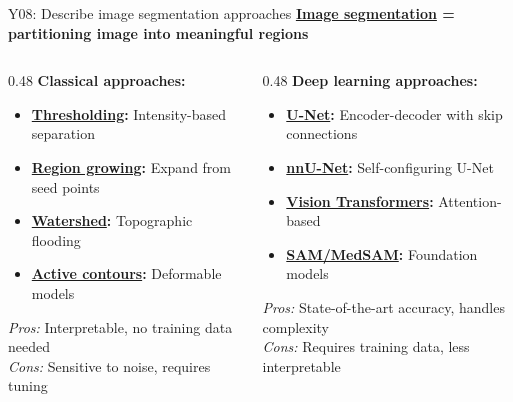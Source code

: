 \documentclass[aspectratio=169, 10pt]{beamer}
\begin{document}
\begin{frame}{Y08: Describe image segmentation approaches}
    \textbf{\href{https://en.wikipedia.org/wiki/Image_segmentation}{Image segmentation} = partitioning image into meaningful regions}
    
    \vspace{0.2cm}
    \begin{columns}[T]
        \begin{column}{0.48\textwidth}
            \textbf{Classical approaches:}
            \begin{itemize}
                \item \textbf{\href{https://en.wikipedia.org/wiki/Thresholding_(image_processing)}{Thresholding}:} Intensity-based separation
                \item \textbf{\href{https://en.wikipedia.org/wiki/Region_growing}{Region growing}:} Expand from seed points
                \item \textbf{\href{https://en.wikipedia.org/wiki/Watershed_(image_processing)}{Watershed}:} Topographic flooding
                \item \textbf{\href{https://en.wikipedia.org/wiki/Active_contour_model}{Active contours}:} Deformable models
            \end{itemize}
            
            \vspace{0.2cm}
            \textit{Pros:} Interpretable, no training data needed\\
            \textit{Cons:} Sensitive to noise, requires tuning
        \end{column}
        \begin{column}{0.48\textwidth}
            \textbf{Deep learning approaches:}
            \begin{itemize}
                \item \textbf{\href{https://arxiv.org/abs/1505.04597}{U-Net}:} Encoder-decoder with skip connections
                \item \textbf{\href{https://arxiv.org/abs/1802.02611}{nnU-Net}:} Self-configuring U-Net
                \item \textbf{\href{https://arxiv.org/abs/2010.11929}{Vision Transformers}:} Attention-based
                \item \textbf{\href{https://segment-anything.com/}{SAM/MedSAM}:} Foundation models
            \end{itemize}
            
            \vspace{0.2cm}
            \textit{Pros:} State-of-the-art accuracy, handles complexity\\
            \textit{Cons:} Requires training data, less interpretable
        \end{column}
    \end{columns}
\end{frame}
\end{document}
